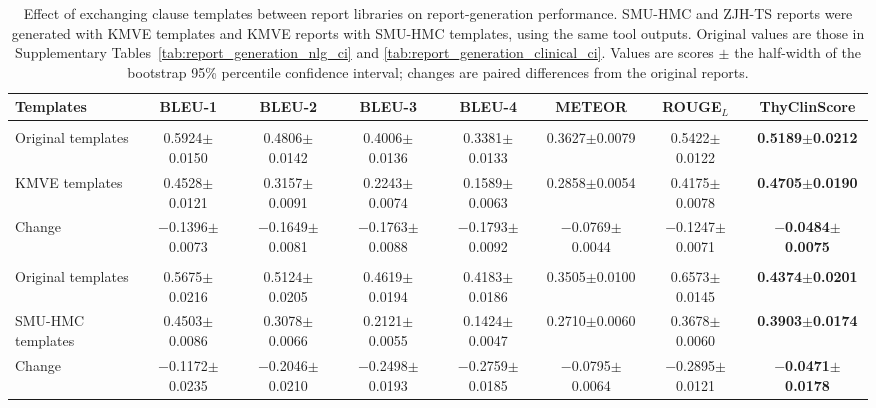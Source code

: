 \begin{table}[p]
\centering
\begin{threeparttable}
\caption{Effect of exchanging clause templates between report libraries on report-generation performance. SMU-HMC and ZJH-TS reports were generated with KMVE templates and KMVE reports with SMU-HMC templates, using the same tool outputs. Original values are those in Supplementary Tables~\ref{tab:report_generation_nlg_ci} and \ref{tab:report_generation_clinical_ci}. Values are scores $\pm$ the half-width of the bootstrap 95\% percentile confidence interval; changes are paired differences from the original reports.}
\label{tab:template_exchange}

\scriptsize
\setlength{\tabcolsep}{2.0pt}
\renewcommand{\arraystretch}{1.08}

\begin{tabular}{lccccccc}
\toprule
\textbf{Templates}
& \textbf{BLEU-1}
& \textbf{BLEU-2}
& \textbf{BLEU-3}
& \textbf{BLEU-4}
& \textbf{METEOR}
& \textbf{ROUGE$_L$}
& \textbf{ThyClinScore} \\
\midrule

\rowcolor{gray!20}
\multicolumn{8}{c}{\textbf{SMU-HMC Testset} ($n=400$)} \\
Original templates
& 0.5924$\pm$0.0150
& 0.4806$\pm$0.0142
& 0.4006$\pm$0.0136
& 0.3381$\pm$0.0133
& 0.3627$\pm$0.0079
& 0.5422$\pm$0.0122
& \textbf{0.5189$\pm$0.0212} \\
KMVE templates
& 0.4528$\pm$0.0121
& 0.3157$\pm$0.0091
& 0.2243$\pm$0.0074
& 0.1589$\pm$0.0063
& 0.2858$\pm$0.0054
& 0.4175$\pm$0.0078
& \textbf{0.4705$\pm$0.0190} \\
\quad Change
& $-$0.1396$\pm$0.0073
& $-$0.1649$\pm$0.0081
& $-$0.1763$\pm$0.0088
& $-$0.1793$\pm$0.0092
& $-$0.0769$\pm$0.0044
& $-$0.1247$\pm$0.0071
& \textbf{$-$0.0484$\pm$0.0075} \\

\midrule
\rowcolor{gray!20}
\multicolumn{8}{c}{\textbf{KMVE Testset} ($n=492$)} \\
Original templates
& 0.5675$\pm$0.0216
& 0.5124$\pm$0.0205
& 0.4619$\pm$0.0194
& 0.4183$\pm$0.0186
& 0.3505$\pm$0.0100
& 0.6573$\pm$0.0145
& \textbf{0.4374$\pm$0.0201} \\
SMU-HMC templates
& 0.4503$\pm$0.0086
& 0.3078$\pm$0.0066
& 0.2121$\pm$0.0055
& 0.1424$\pm$0.0047
& 0.2710$\pm$0.0060
& 0.3678$\pm$0.0060
& \textbf{0.3903$\pm$0.0174} \\
\quad Change
& $-$0.1172$\pm$0.0235
& $-$0.2046$\pm$0.0210
& $-$0.2498$\pm$0.0193
& $-$0.2759$\pm$0.0185
& $-$0.0795$\pm$0.0064
& $-$0.2895$\pm$0.0121
& \textbf{$-$0.0471$\pm$0.0178} \\


\end{tabular}
\end{threeparttable}
\end{table}
